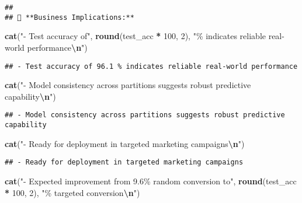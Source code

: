 \documentclass[
]{article}
\newenvironment{Shaded}{\begin{snugshade}}{\end{snugshade}}
\newcommand{\DecValTok}[1]{\textcolor[rgb]{0.00,0.00,0.81}{#1}}
\newcommand{\FunctionTok}[1]{\textcolor[rgb]{0.13,0.29,0.53}{\textbf{#1}}}
\newcommand{\NormalTok}[1]{#1}
\newcommand{\SpecialCharTok}[1]{\textcolor[rgb]{0.81,0.36,0.00}{\textbf{#1}}}
\newcommand{\StringTok}[1]{\textcolor[rgb]{0.31,0.60,0.02}{#1}}
\begin{document}
\begin{verbatim}
## 
## 💼 **Business Implications:**
\end{verbatim}

\begin{Shaded}
\begin{Highlighting}[]
\FunctionTok{cat}\NormalTok{(}\StringTok{"{-} Test accuracy of"}\NormalTok{, }\FunctionTok{round}\NormalTok{(test\_acc }\SpecialCharTok{*} \DecValTok{100}\NormalTok{, }\DecValTok{2}\NormalTok{), }\StringTok{"\% indicates reliable real{-}world performance}\SpecialCharTok{\textbackslash{}n}\StringTok{"}\NormalTok{)}
\end{Highlighting}
\end{Shaded}

\begin{verbatim}
## - Test accuracy of 96.1 % indicates reliable real-world performance
\end{verbatim}

\begin{Shaded}
\begin{Highlighting}[]
\FunctionTok{cat}\NormalTok{(}\StringTok{"{-} Model consistency across partitions suggests robust predictive capability}\SpecialCharTok{\textbackslash{}n}\StringTok{"}\NormalTok{)}
\end{Highlighting}
\end{Shaded}

\begin{verbatim}
## - Model consistency across partitions suggests robust predictive capability
\end{verbatim}

\begin{Shaded}
\begin{Highlighting}[]
\FunctionTok{cat}\NormalTok{(}\StringTok{"{-} Ready for deployment in targeted marketing campaigns}\SpecialCharTok{\textbackslash{}n}\StringTok{"}\NormalTok{)}
\end{Highlighting}
\end{Shaded}

\begin{verbatim}
## - Ready for deployment in targeted marketing campaigns
\end{verbatim}

\begin{Shaded}
\begin{Highlighting}[]
\FunctionTok{cat}\NormalTok{(}\StringTok{"{-} Expected improvement from 9.6\% random conversion to"}\NormalTok{, }\FunctionTok{round}\NormalTok{(test\_acc }\SpecialCharTok{*} \DecValTok{100}\NormalTok{, }\DecValTok{2}\NormalTok{), }\StringTok{"\% targeted conversion}\SpecialCharTok{\textbackslash{}n}\StringTok{"}\NormalTok{)}
\end{Highlighting}
\end{Shaded}
\end{document}
